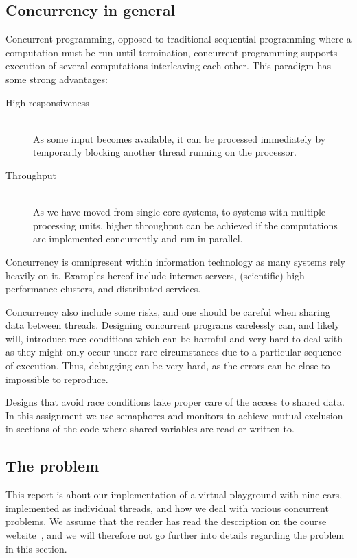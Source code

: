 
\subsection{Concurrency in general}
Concurrent programming, opposed to traditional sequential programming
where a computation must be run until termination, concurrent
programming supports execution of several computations interleaving
each other. This paradigm has some strong advantages:
\begin{description}
\item[High responsiveness] \ \\
  As some input becomes available, it can be processed immediately by
  temporarily blocking another thread running on the processor.
\item[Throughput] \ \\
  As we have moved from single core systems, to systems with multiple
  processing units, higher throughput can be achieved if the
  computations are implemented concurrently and run in parallel.
\end{description}

Concurrency is omnipresent within information technology as many
systems rely heavily on it. Examples hereof include internet servers,
(scientific) high performance clusters, and distributed services.

Concurrency also include some risks, and one should be careful
when sharing data between threads. Designing concurrent programs
carelessly can, and likely will, introduce race conditions which can
be harmful and very hard to deal with as they might only occur under
rare circumstances due to a particular sequence of execution. Thus,
debugging can be very hard, as the errors can be close to impossible
to reproduce.

Designs that avoid race conditions take proper care of the access to
shared data. In this assignment we use semaphores and monitors to
achieve mutual exclusion in sections of the code where shared
variables are read or written to.


\subsection{The problem}
This report is about our implementation of a virtual playground with
nine cars, implemented as individual threads, and how we deal with
various concurrent problems. We assume that the reader has read the
description on the course website~\cite{assignment}, and we will
therefore not go further into details regarding the problem in this
section.


